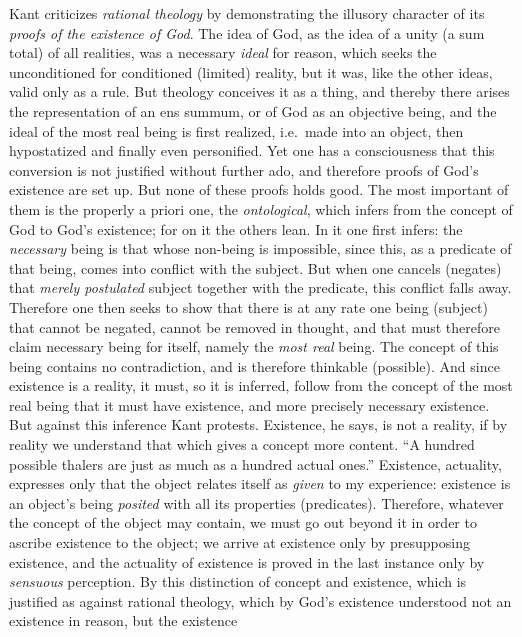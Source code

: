 Kant criticizes \emph{rational theology} by demonstrating the illusory
character of its \emph{proofs of the existence of God}. The idea of God,
as the idea of a unity (a sum total) of all realities, was a necessary
\emph{ideal} for reason, which seeks the unconditioned for conditioned
(limited) reality, but it was, like the other ideas, valid only as a
rule. But theology conceives it as a thing, and thereby there arises the
representation of an ens summum, or of God as an objective being, and the
ideal of the most real being is first realized, i.e.\ made into an
object, then hypostatized and finally even personified. Yet one has a
consciousness that this conversion is not justified without further ado,
and therefore proofs of God's existence are set up. But none of these
proofs holds good. The most important of them is the properly a priori
one, the \emph{ontological}, which infers from the concept of God to
God's existence; for on it the others lean. In it one first infers: the
\emph{necessary} being is that whose non-being is impossible, since this,
as a predicate of that being, comes into conflict with the subject. But
when one cancels (negates) that \emph{merely postulated} subject together
with the predicate, this conflict falls away. Therefore one then seeks to
show that there is at any rate one being (subject) that cannot be
negated, cannot be removed in thought, and that must therefore claim
necessary being for itself, namely the \emph{most real} being. The
concept of this being contains no contradiction, and is therefore
thinkable (possible). And since existence is a reality, it must, so it is
inferred, follow from the concept of the most real being that it must
have existence, and more precisely necessary existence. But against this
inference Kant protests. Existence, he says, is not a reality, if by
reality we understand that which gives a concept more content. ``A
hundred possible thalers are just as much as a hundred actual ones.''
Existence, actuality, expresses only that the object relates itself as
\emph{given} to my experience: existence is an object's being \emph{posited}
with all its properties (predicates). Therefore, whatever the concept of
the object may contain, we must go out beyond it in order to ascribe
existence to the object; we arrive at existence only by presupposing
existence, and the actuality of existence is proved in the last instance
only by \emph{sensuous} perception. By this distinction of concept and
existence, which is justified as against rational theology, which by
God's existence understood not an existence in reason, but the existence
